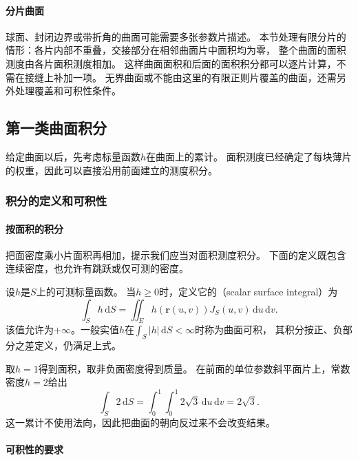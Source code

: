 \paragraph{分片曲面}

球面、封闭边界或带折角的曲面可能需要多张参数片描述。
本节处理有限分片的情形：各片内部不重叠，交接部分在相邻曲面片中面积均为零，
整个曲面的面积测度由各片面积测度相加。
这样曲面面积和后面的面积积分都可以逐片计算，不需在接缝上补加一项。
无界曲面或不能由这里的有限正则片覆盖的曲面，还需另外处理覆盖和可积性条件。

\subsection{第一类曲面积分}

给定曲面以后，先考虑标量函数$h$在曲面上的累计。
面积测度已经确定了每块薄片的权重，因此可以直接沿用前面建立的测度积分。

\subsubsection{积分的定义和可积性}

\paragraph{按面积的积分}

把面密度乘小片面积再相加，提示我们应当对面积测度积分。
下面的定义既包含连续密度，也允许有跳跃或仅可测的密度。

\begin{definition}[第一类曲面积分]
\label{def:analysis-scalar-surface-integral}
设$h$是$S$上的可测标量函数。
当$h\geq0$时，定义它的（scalar surface integral）为
\begin{equation}
 \int_Sh\,\mathrm dS
 =\iint_Eh(\bm r(u,v))J_S(u,v)\,\mathrm du\,\mathrm dv.
 \label{eq:analysis-scalar-surface-integral}
\end{equation}
该值允许为$+\infty$。一般实值$h$在$\int_S|h|\,\mathrm dS<\infty$时称为曲面可积，
其积分按正、负部分之差定义，仍满足上式。
\end{definition}

取$h=1$得到面积，取非负面密度得到质量。
在前面的单位参数斜平面片上，常数密度$h=2$给出
\[
 \int_S2\,\mathrm dS=\int_0^1\int_0^1 2\sqrt3\,\mathrm du\,\mathrm dv=2\sqrt3.
\]
这一累计不使用法向，因此把曲面的朝向反过来不会改变结果。

\paragraph{可积性的要求}


